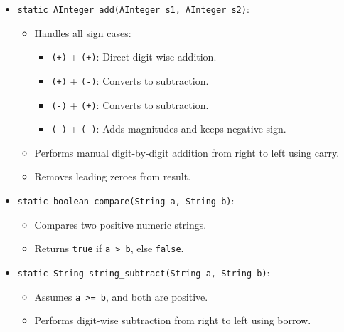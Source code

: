 \documentclass{article}
\begin{document}
\begin{itemize}
    \item \texttt{static AInteger add(AInteger s1, AInteger s2)}:
    \begin{itemize}
        \item Handles all sign cases:
        \begin{itemize}
            \item \texttt{(+)} + \texttt{(+)}: Direct digit-wise addition.
            \item \texttt{(+)} + \texttt{(-)}: Converts to subtraction.
            \item \texttt{(-)} + \texttt{(+)}: Converts to subtraction.
            \item \texttt{(-)} + \texttt{(-)}: Adds magnitudes and keeps negative sign.
        \end{itemize}
        \item Performs manual digit-by-digit addition from right to left using carry.
        \item Removes leading zeroes from result.
    \end{itemize}
\end{itemize}


\begin{itemize}
    \item \texttt{static boolean compare(String a, String b)}:
    \begin{itemize}
        \item Compares two positive numeric strings.
        \item Returns \texttt{true} if \texttt{a > b}, else \texttt{false}.
    \end{itemize}
\end{itemize}


\begin{itemize}
    \item \texttt{static String string\_subtract(String a, String b)}:
    \begin{itemize}
        \item Assumes \texttt{a >= b}, and both are positive.
        \item Performs digit-wise subtraction from right to left using borrow.
    \end{itemize}
\end{itemize}
\end{document}
